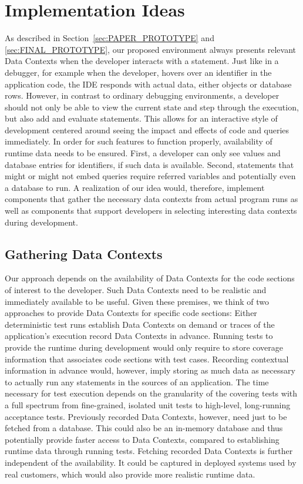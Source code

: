 \section{Implementation Ideas} \label{sec:IMPLEMENTATION_IDEAS}
As described in Section~\ref{sec:PAPER_PROTOTYPE} and \ref{sec:FINAL_PROTOTYPE}, our proposed environment always presents relevant Data Contexts when the developer interacts with a statement.
Just like in a debugger, for example when the developer, hovers over an identifier in the application code, the IDE responds with actual data, either objects or database rows.
However, in contrast to ordinary debugging environments, a developer should not only be able to view the current state and step through the execution, but also add and evaluate statements.
This allows for an interactive style of development centered around seeing the impact and effects of code and queries immediately.
In order for such features to function properly, availability of runtime data needs to be ensured.
First, a developer can only see values and database entries for identifiers, if such data is available.
Second, statements that might or might not embed queries require referred variables and potentially even a database to run.
A realization of our idea would, therefore, implement components that gather the necessary data contexts from actual program runs as well as components that support developers in selecting interesting data contexts during development.

\subsection{Gathering Data Contexts}

Our approach depends on the availability of Data Contexts for the code sections of interest to the developer.
Such Data Contexts need to be realistic and immediately available to be useful.
Given these premises, we think of two approaches to provide Data Contexts for specific code sections:
Either deterministic test runs establish Data Contexts on demand or traces of the application's execution record Data Contexts in advance.
Running tests to provide the runtime during development would only require to store coverage information that associates code sections with test cases. Recording contextual information in advance would, however, imply storing as much data as necessary to actually run any statements in the sources of an application.
The time necessary for test execution depends on the granularity of the covering tests with a full spectrum from fine-grained, isolated unit tests to high-level, long-running acceptance tests.
Previously recorded Data Contexts, however, need just to be fetched from a database. This could also be an in-memory database and thus potentially provide faster access to Data Contexts, compared to establishing runtime data through running tests.
Fetching recorded Data Contexts is further independent of the availability.
It could be captured in deployed systems used by real customers, which would also provide more realistic runtime data.

